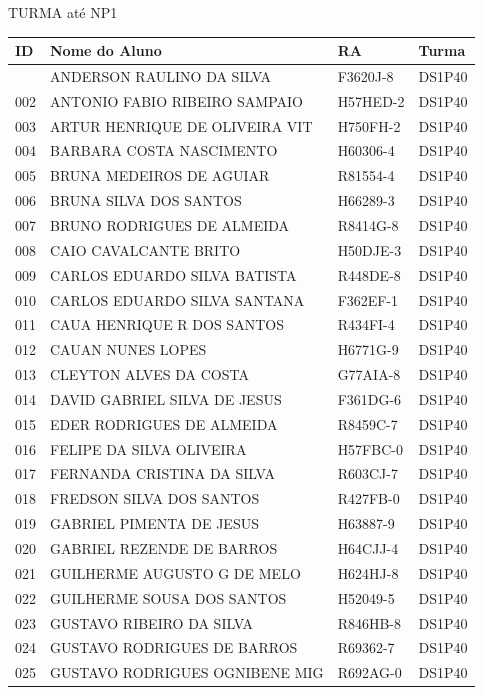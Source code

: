 \documentclass[
]{book}
\begin{document}
TURMA até NP1

\begin{longtable}[]{@{}llll@{}}
\toprule\noalign{}
ID & Nome do Aluno & RA & Turma \\
\midrule\noalign{}
\endhead
\bottomrule\noalign{}
\endlastfoot
001 & ANDERSON RAULINO DA SILVA & F3620J-8 & DS1P40 \\
002 & ANTONIO FABIO RIBEIRO SAMPAIO & H57HED-2 & DS1P40 \\
003 & ARTUR HENRIQUE DE OLIVEIRA VIT & H750FH-2 & DS1P40 \\
004 & BARBARA COSTA NASCIMENTO & H60306-4 & DS1P40 \\
005 & BRUNA MEDEIROS DE AGUIAR & R81554-4 & DS1P40 \\
006 & BRUNA SILVA DOS SANTOS & H66289-3 & DS1P40 \\
007 & BRUNO RODRIGUES DE ALMEIDA & R8414G-8 & DS1P40 \\
008 & CAIO CAVALCANTE BRITO & H50DJE-3 & DS1P40 \\
009 & CARLOS EDUARDO SILVA BATISTA & R448DE-8 & DS1P40 \\
010 & CARLOS EDUARDO SILVA SANTANA & F362EF-1 & DS1P40 \\
011 & CAUA HENRIQUE R DOS SANTOS & R434FI-4 & DS1P40 \\
012 & CAUAN NUNES LOPES & H6771G-9 & DS1P40 \\
013 & CLEYTON ALVES DA COSTA & G77AIA-8 & DS1P40 \\
014 & DAVID GABRIEL SILVA DE JESUS & F361DG-6 & DS1P40 \\
015 & EDER RODRIGUES DE ALMEIDA & R8459C-7 & DS1P40 \\
016 & FELIPE DA SILVA OLIVEIRA & H57FBC-0 & DS1P40 \\
017 & FERNANDA CRISTINA DA SILVA & R603CJ-7 & DS1P40 \\
018 & FREDSON SILVA DOS SANTOS & R427FB-0 & DS1P40 \\
019 & GABRIEL PIMENTA DE JESUS & H63887-9 & DS1P40 \\
020 & GABRIEL REZENDE DE BARROS & H64CJJ-4 & DS1P40 \\
021 & GUILHERME AUGUSTO G DE MELO & H624HJ-8 & DS1P40 \\
022 & GUILHERME SOUSA DOS SANTOS & H52049-5 & DS1P40 \\
023 & GUSTAVO RIBEIRO DA SILVA & R846HB-8 & DS1P40 \\
024 & GUSTAVO RODRIGUES DE BARROS & R69362-7 & DS1P40 \\
025 & GUSTAVO RODRIGUES OGNIBENE MIG & R692AG-0 & DS1P40 \\

\end{longtable}
\end{document}
